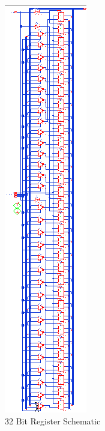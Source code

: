 \documentclass[11pt]{article}
\begin{document}
		\begin{figure}[H] 
			\centering 
			\includegraphics[width=\textwidth,height=\dimexpr\textheight-4\baselineskip-\abovecaptionskip-\belowcaptionskip\relax,keepaspectratio]{"Pictures/nBitRegister 32-Bit Schematic"}
			\caption{32 Bit Register Schematic} 
			\label{fig:nBitRegister-32-Bit-Schematic} 
		\end{figure}
	
\end{document}
